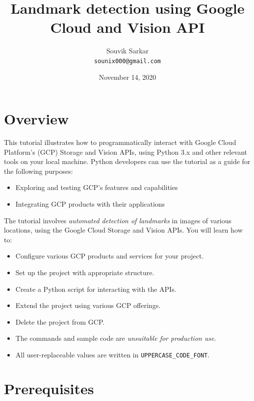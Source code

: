 \documentclass{article}
\title{Landmark detection using Google Cloud and Vision API}
\author{Souvik Sarkar \\ \texttt{sounix000@gmail.com}}
\date{November 14, 2020}
\begin{document}
\maketitle

\section*{Overview}

This tutorial illustrates how to programmatically interact with Google Cloud Platform's (GCP) Storage and Vision APIs, using Python 3.x and other relevant tools on your local machine. Python developers can use the tutorial as a guide for the following purposes:

\begin{itemize}
    \item Exploring and testing GCP's features and capabilities
    \item Integrating GCP products with their applications
\end{itemize}

The tutorial involves \textit{automated detection of landmarks} in images of various locations, using the Google Cloud Storage and Vision APIs. You will learn how to:

\begin{itemize}
    \item Configure various GCP products and services for your project.
    \item Set up the project with appropriate structure.
    \item Create a Python script for interacting with the APIs.
    \item Extend the project using various GCP offerings.
    \item Delete the project from GCP.
\end{itemize}

\begin{tcolorbox}[colback=blue!5!white,colframe=blue!75!black,title=Note]
\begin{itemize}
    \item The commands and sample code are \textit{unsuitable for production use}.
    \item All user-replaceable values are written in \texttt{UPPERCASE\_CODE\_FONT}.
\end{itemize}
\end{tcolorbox}

\section*{Prerequisites}
\end{document}
